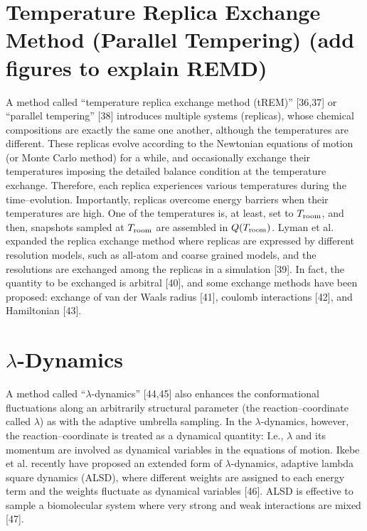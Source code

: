 \section{Temperature Replica Exchange Method (Parallel Tempering)
{\color{red} (add figures to explain REMD)}
}
A method called “temperature replica exchange method (tREM)” [36,37] or “parallel tempering” [38] introduces multiple systems (replicas), whose chemical compositions are exactly the same one another, although the temperatures are different. These replicas evolve according to the Newtonian equations of motion (or Monte Carlo method) for a while, and occasionally exchange their temperatures imposing the detailed balance condition at the temperature exchange. Therefore, each replica experiences various temperatures during the time–evolution. Importantly, replicas overcome energy barriers when their temperatures are high. One of the temperatures is, at least, set to $T_{\rm room}$, and then, snapshots sampled at $T_{\rm room}$ are assembled in $Q(T_{\rm room})$. Lyman et al. expanded the replica exchange method where replicas are expressed by different resolution models, such as all-atom and coarse grained models, and the resolutions are exchanged among the replicas in a simulation [39]. In fact, the quantity to be exchanged is arbitral [40], and some exchange methods have been proposed: exchange of van der Waals radius [41], coulomb interactions [42], and Hamiltonian [43].

\section{$\lambda$-Dynamics}
A method called “$\lambda$-dynamics” [44,45] also enhances the conformational fluctuations along an arbitrarily structural parameter (the reaction–coordinate called $\lambda$) as with the adaptive umbrella sampling. In the $\lambda$-dynamics, however, the reaction–coordinate is treated as a dynamical quantity: I.e., $\lambda$ and its momentum  are involved as dynamical variables in the equations of motion. Ikebe et al. recently have proposed an extended form of $\lambda$-dynamics, adaptive lambda square dynamics (ALSD), where different weights are assigned to each energy term and the weights fluctuate as dynamical variables [46]. ALSD is effective to sample a biomolecular system where very strong and weak interactions are mixed [47].


